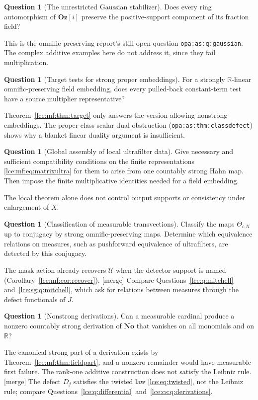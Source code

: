 \documentclass[11pt,letterpaper]{article}
\numberwithin{equation}{section}
\theoremstyle{definition}
\newtheorem{question}[theorem]{Question}
\theoremstyle{remark}
\newcommand{\No}{\mathbf{No}}
\newcommand{\Oz}{\mathbf{Oz}}
\newcommand{\R}{\mathbb R}
\newcommand{\thref}[1]{Theorem~\ref{#1}}
\newcommand{\mergetag}{\textup{\textsf{\small[merge]}}}%
\newcommand{\lbl}[1]{\nolinkurl{#1}}%
\begin{document}
\begin{question}[The unrestricted Gaussian stabilizer]\label{lce:mf:q:gaussian}
Does every ring automorphism of $\Oz[i]$ preserve the positive-support
component of its fraction field?
\end{question}
This is the omnific-preserving report's still-open question
\lbl{opa:as:q:gaussian}. The complex additive examples here do not address
it, since they fail multiplication.

\begin{question}[Target tests for strong proper embeddings]\label{lce:mf:q:targetstrong}
For a strongly $\R$-linear omnific-preserving field embedding, does every
pulled-back constant-term test have a source multiplier representative?
\end{question}
\thref{lce:mf:thm:target} only answers the version allowing nonstrong
embeddings. The proper-class scalar dual obstruction
(\lbl{opa:as:thm:classdefect}) shows why a blanket linear duality argument is
insufficient.

\begin{question}[Global assembly of local ultrafilter data]\label{lce:mf:q:assembly}
Give necessary and sufficient compatibility conditions on the finite
representations \eqref{lce:mf:eq:matrixultra} for them to arise from one
countably strong Hahn map. Then impose the finite multiplicative identities
needed for a field embedding.
\end{question}
The local theorem alone does not control output supports or consistency
under enlargement of $X$.

\begin{question}[Classification of measurable transvections]\label{lce:mf:q:transvections}
Classify the maps $\Theta_{c,\mathcal U}$ up to conjugacy by strong
omnific-preserving maps. Determine which equivalence relations on measures,
such as pushforward equivalence of ultrafilters, are detected by this
conjugacy.
\end{question}
The mask action already recovers $\mathcal U$ when the detector support is
named (Corollary~\ref{lce:mf:cor:recover}). \mergetag{} Compare
Questions~\ref{lce:q:mitchell} and~\ref{lce:sg:q:mitchell}, which ask for
relations between measures through the defect functionals of $J$.

\begin{question}[Nonstrong derivations]\label{lce:mf:q:derivations}
Can a measurable cardinal produce a nonzero countably strong derivation of
$\No$ that vanishes on all monomials and on $\R$?
\end{question}
The canonical strong part of a derivation exists by
\thref{lce:mf:thm:fieldpart}, and a nonzero remainder would have measurable
first failure. The rank-one additive construction does not satisfy the
Leibniz rule. \mergetag{} The defect $D_j$ satisfies the twisted law
\eqref{lce:eq:twisted}, not the Leibniz rule; compare
Questions~\ref{lce:q:differential} and~\ref{lce:cs:q:derivations}.
\end{document}
